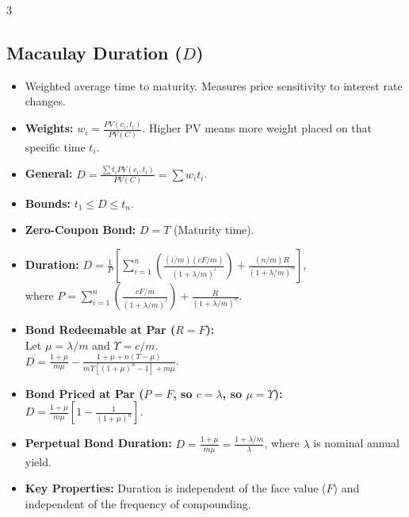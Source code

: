 \documentclass[8pt,a4paper,landscape]{extarticle}
\begin{document}
\begin{multicols*}{3}
    \subsection{Macaulay Duration ($D$)}
    \begin{itemize}
        \item Weighted average time to maturity. Measures price sensitivity to interest rate changes.
        \item \textbf{Weights:} $w_i = \frac{PV(c_i, t_i)}{PV(C)}$. Higher PV means more weight placed on that specific time $t_i$.
        \item \textbf{General:} $D = \frac{\sum t_i PV(c_i, t_i)}{PV(C)} = \sum w_i t_i$.
        \item \textbf{Bounds:} $t_1 \le D \le t_n$.
        \item \textbf{Zero-Coupon Bond:} $D = T$ (Maturity time).
        \item \textbf{Duration:} $D = \frac{1}{P} \left[ \sum_{i=1}^{n} (\frac{(i/m)(cF/m)}{(1 + \lambda/m)^i}) + \frac{(n/m)R}{(1 + \lambda/m)^n} \right]$,
              \\ where $P = \sum_{i=1}^{n} (\frac{cF/m}{(1 + \lambda/m)^i}) + \frac{R}{(1 + \lambda/m)^n}$.
        \item \textbf{Bond Redeemable at Par ($R=F$):} \\ Let $\mu = \lambda/m$ and $\Upsilon = c/m$. \\
              $D = \frac{1+\mu}{m\mu} - \frac{1+\mu + n(\Upsilon-\mu)}{m\Upsilon[(1+\mu)^n - 1] + m\mu}$.
        \item \textbf{Bond Priced at Par ($P=F$, so $c = \lambda$, so $\mu=\Upsilon$):} \\ $D = \frac{1+\mu}{m\mu}[1 - \frac{1}{(1+\mu)^{n}}]$.
        \item \textbf{Perpetual Bond Duration:} $D = \frac{1 + \mu}{m\mu} = \frac{1+\lambda/m}{\lambda}$, where $\lambda$ is nominal annual yield.
        \item \textbf{Key Properties:} Duration is independent of the face value ($F$) and independent of the frequency of compounding.
    \end{itemize}


\end{multicols*}
\end{document}
